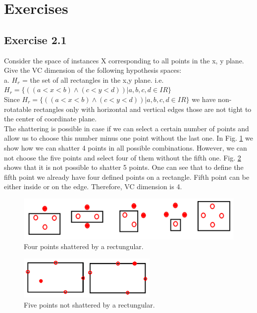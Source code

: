 \documentclass[a4paper, 12pt]{article}
\begin{document}
\section{Exercises}

\subsection*{Exercise 2.1}
Consider the space of instances X corresponding to all points in the x, y plane. Give the VC dimension of the following hypothesis spaces:\\

a. $H_r$ = the set of all rectangles in the x,y plane. i.e. $H_r = \{((a < x < b) \wedge (c < y < d)) | a, b, c, d \in IR\}$\\

Since $H_r = \{((a < x < b) \wedge (c < y < d)) | a, b, c, d \in IR\}$ we have non-rotatable rectangles only with horizontal and vertical edges those are not tight to the center of coordinate plane. \\
The shattering is possible in case if we can select a certain number of points and allow us to choose this number minus one point without the last one. In Fig. \ref{fig:RectangularPoints} we show how we can shatter 4 points in all possible combinations. However, we can not choose the five points and select four of them without the fifth one.  Fig. \ref{fig:Rectangular5Points} shows that it is not possible to shatter 5 points. One can see that to define the fifth point we already have four defined points on a rectangle. Fifth point can be either inside or on the edge. Therefore, VC dimension is 4. 

\begin{figure}[h]
  \centering
  \caption{Four points shattered by a rectungular.\label{fig:RectangularPoints}}
  \includegraphics[width=1.0\textwidth]{RectangularPoints}
\end{figure}

\begin{figure}[h]
  \centering
  \caption{Five points not shattered by a rectungular.\label{fig:Rectangular5Points}}
  \includegraphics[width=0.6\textwidth]{Rectangular5Points}
\end{figure}
\end{document}

